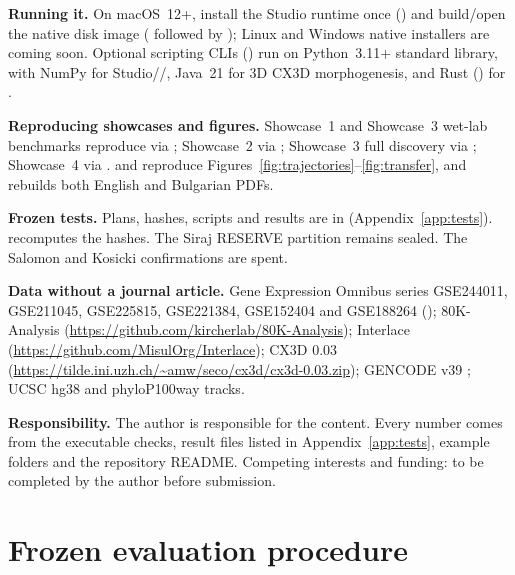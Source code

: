 \documentclass[10.5pt,a4paper]{article}
\begin{document}
\textbf{Running it.} On macOS~12+, install the Studio runtime once () and build/open the native disk image ( followed by ); Linux and Windows native installers are coming soon\texttrademark. Optional scripting CLIs () run on Python~3.11+ standard library, with NumPy for Studio//, Java~21 for 3D CX3D morphogenesis, and Rust () for .

\textbf{Reproducing showcases and figures.} Showcase~1 and Showcase~3 wet-lab benchmarks reproduce via ; Showcase~2 via ; Showcase~3 full discovery via ; Showcase~4 via .  and  reproduce Figures~\ref{fig:trajectories}--\ref{fig:transfer}, and  rebuilds both English and Bulgarian PDFs.

\textbf{Frozen tests.} Plans, hashes, scripts and results are in  (Appendix~\ref{app:tests}).  recomputes the hashes. The Siraj RESERVE partition remains sealed. The Salomon and Kosicki confirmations are spent.

\textbf{Data without a journal article.} Gene Expression Omnibus series GSE244011, GSE211045, GSE225815, GSE221384, GSE152404 and GSE188264 (\citealt{kreimer2022}); 80K-Analysis (\url{https://github.com/kircherlab/80K-Analysis}); Interlace (\url{https://github.com/MisulOrg/Interlace}); CX3D 0.03 (\url{https://tilde.ini.uzh.ch/~amw/seco/cx3d/cx3d-0.03.zip}); GENCODE v39 \citep{frankish2021}; UCSC hg38 and phyloP100way tracks.

\textbf{Responsibility.} The author is responsible for the content. Every number comes from the executable checks, result files listed in Appendix~\ref{app:tests}, example folders and the repository README. Competing interests and funding: to be completed by the author before submission.



\appendix

\section{Frozen evaluation procedure}\label{app:protocol}
\end{document}
